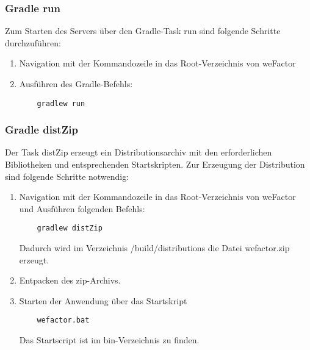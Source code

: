 \subsubsection{Gradle run}
Zum Starten des Servers über den Gradle-Task run sind folgende Schritte durchzuführen:
   \begin{enumerate}

    \item Navigation mit der Kommandozeile in das Root-Verzeichnis von weFactor
    \item Ausführen des Gradle-Befehls:
    \begin{lstlisting}
    gradlew run
    \end{lstlisting}

   \end{enumerate}

\subsubsection{Gradle distZip}
Der Task distZip erzeugt ein Distributionsarchiv mit den erforderlichen Bibliotheken und entsprechenden Startskripten. Zur Erzeugung der Distribution sind folgende Schritte notwendig:

   \begin{enumerate}

    \item Navigation mit der Kommandozeile in das Root-Verzeichnis von weFactor und Ausführen folgenden Befehls:
    \begin{lstlisting}
    gradlew distZip
    \end{lstlisting}
    Dadurch wird im Verzeichnis /build/distributions die Datei wefactor.zip erzeugt.
    \item Entpacken des zip-Archivs.
    \item Starten der Anwendung über das Startskript
    \begin{lstlisting}
    wefactor.bat
    \end{lstlisting}
    Das Startscript ist im bin-Verzeichnis zu finden.
        

   \end{enumerate}



